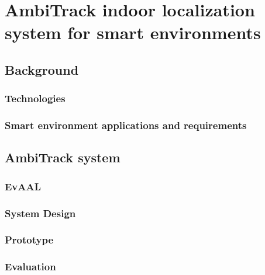 \chapter{AmbiTrack indoor localization system for smart environments}
\label{ch:ambitrack}
\section{Background}
\subsection{Technologies}
\subsection{Smart environment applications and requirements}
\section{AmbiTrack system}
\subsection{EvAAL}
\subsection{System Design}
\subsection{Prototype}
\subsection{Evaluation}